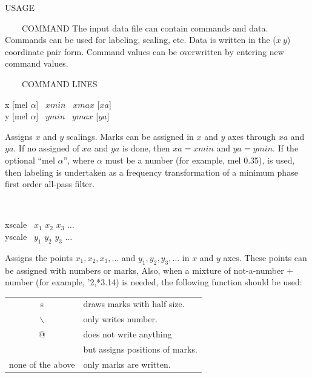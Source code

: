 \vspace{-1cm}
\begin{qsection}{USAGE}
~\vspace{-1cm}
\end{qsection}

\begin{qsection}{\ ~~~COMMAND}
The input data file can contain commands and data.
Commands can be used for labeling, scaling, etc.
Data is written in the ($x ~y$) coordinate pair form.
Command values can be overwritten by entering new command values.
\end{qsection}

\vspace{-1cm}
\begin{qsection}{\ ~~~COMMAND LINES}
\begin{minipage}[t]{5.5cm}
x [mel $\alpha$]~ $xmin$ ~$xmax$ [$xa$]\\
y [mel $\alpha$]~ $ymin$ ~$ymax$ [$ya$]\\
\end{minipage}
\begin{minipage}[t]{9cm}
Assigns $x$ and $y$ scalings.
Marks can be assigned in $x$ and $y$ axes through $xa$ and $ya$.
If no assigned of $xa$ and $ya$ is done,
then $xa = xmin$ and $ya = ymin$.
If the optional ``mel $\alpha$'', where $\alpha$ must be
a number (for example, mel 0.35), is used,
then labeling is undertaken as a frequency transformation of
a minimum phase first order all-pass filter.
\end{minipage} \\

\begin{minipage}[t]{5.5cm}
xscale ~$x_1$ $x_2$ $x_3$ $\dots$\\
yscale ~$y_1$ $y_2$ $y_3$ $\dots$
\end{minipage}
\begin{minipage}[t]{9cm}
Assigns the points $x_1, x_2,x_3,\dots$
and $y_1,y_2,y_3,\dots$ in $x$ and $y$ axes.
These points can be assigned with numbers or marks,
Also, when a mixture of not-a-number $+$ number (for example, '2,*3.14)
is needed, the following function should be used:

\begin{tabular}{cl}
s & draws marks with half size.\\
$\backslash$& only writes number.\\
@ & does not write anything \\
  & but assigns positions of marks.\\
none of the above & only marks are written.
\end{tabular}\\


\end{minipage}
\end{qsection}
